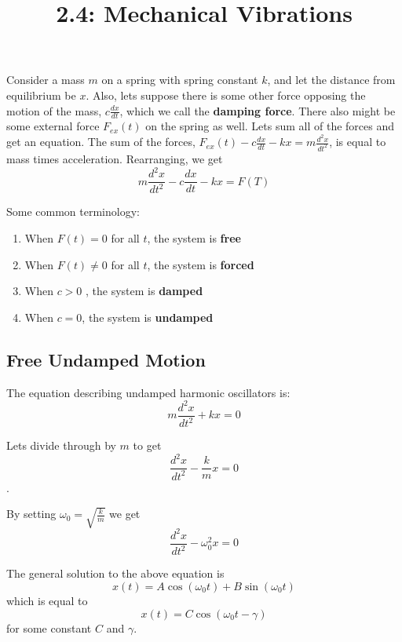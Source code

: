 \documentclass{article}
\title{2.4: Mechanical Vibrations}
\begin{document}
\maketitle

\begin{proposition}
Consider a mass $m$ on a spring with spring constant $k$, and let the distance from equilibrium be $x$. Also, lets suppose there is some other force opposing the motion of the mass, $c \frac{dx}{dt}$, which we call the \textbf{damping force}. There also might be some external force $F_{ex}(t)$ on the spring as well. Lets sum all of the forces and get an equation. The sum of the forces, $F_{ex}(t) - c \frac{dx}{dt} - kx = m \frac{d^2x}{dt^2}$, is equal to mass times acceleration. Rearranging, we get $$m \frac{d^2x}{dt^2} - c \frac{dx}{dt} - kx = F(T)$$
\end{proposition}
\begin{definition}
Some common terminology:
    \begin{enumerate}
        \item When $F(t) = 0$ for all $t$, the system is \textbf{free}
        \item When $F(t) \neq 0$ for all $t$, the system is \textbf{forced}
        \item When $c > 0$ , the system is \textbf{damped}
        \item When $c = 0$, the system is \textbf{undamped}    
    \end{enumerate} 
\end{definition}

\subsection{Free Undamped Motion}

\begin{definition}
The equation describing undamped harmonic oscillators is:$$m \frac{d^2x}{dt^2}  + kx = 0$$
\end{definition}
Lets divide through by $m$ to get $$\frac{d^2x}{dt^2} - \frac{k}{m} x = 0$$.

By setting $\omega_0 = \sqrt{\frac{k}{m}}$ we get $$\frac{d^2x}{dt^2} - \omega_0^2x = 0$$

The general solution to the above equation is $$x(t) = A\cos(\omega_0 t) + B\sin(\omega_0 t)$$which is equal to $$x(t) = C\cos(\omega_0 t - \gamma)$$for some constant $C$ and $\gamma$.
\end{document}
